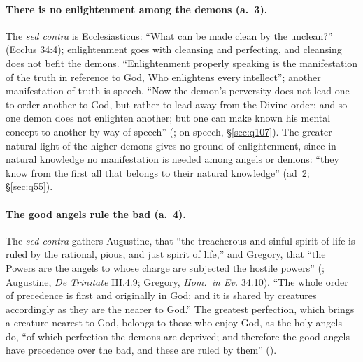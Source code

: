\paragraph{There is no enlightenment among the demons (a.~3).} The
\emph{sed contra} is Ecclesiasticus: ``What can be made clean by the
unclean?'' (Ecclus 34:4); enlightenment goes with cleansing and perfecting,
and cleansing does not befit the demons. ``Enlightenment properly speaking is
the manifestation of the truth in reference to God, Who enlightens every
intellect''; another manifestation of truth is speech. ``Now the demon's
perversity does not lead one to order another to God, but rather to lead away
from the Divine order; and so one demon does not enlighten another; but one
can make known his mental concept to another by way of speech'' (; on speech, \S\ref{sec:q107}). The greater natural light of
the higher demons gives no ground of enlightenment, since in natural
knowledge no manifestation is needed among angels or demons: ``they know from
the first all that belongs to their natural knowledge'' (ad~2;
\S\ref{sec:q55}).

\paragraph{The good angels rule the bad (a.~4).} The \emph{sed contra}
gathers Augustine, that ``the treacherous and sinful spirit of life is ruled
by the rational, pious, and just spirit of life,'' and Gregory, that ``the
Powers are the angels to whose charge are subjected the hostile powers''
(; Augustine, \emph{De Trinitate} III.4.9; Gregory,
\emph{Hom.\ in Ev.} 34.10). ``The whole order of precedence is first and
originally in God; and it is shared by creatures accordingly as they are the
nearer to God.'' The greatest perfection, which brings a creature nearest to
God, belongs to those who enjoy God, as the holy angels do, ``of which
perfection the demons are deprived; and therefore the good angels have
precedence over the bad, and these are ruled by them'' ().

